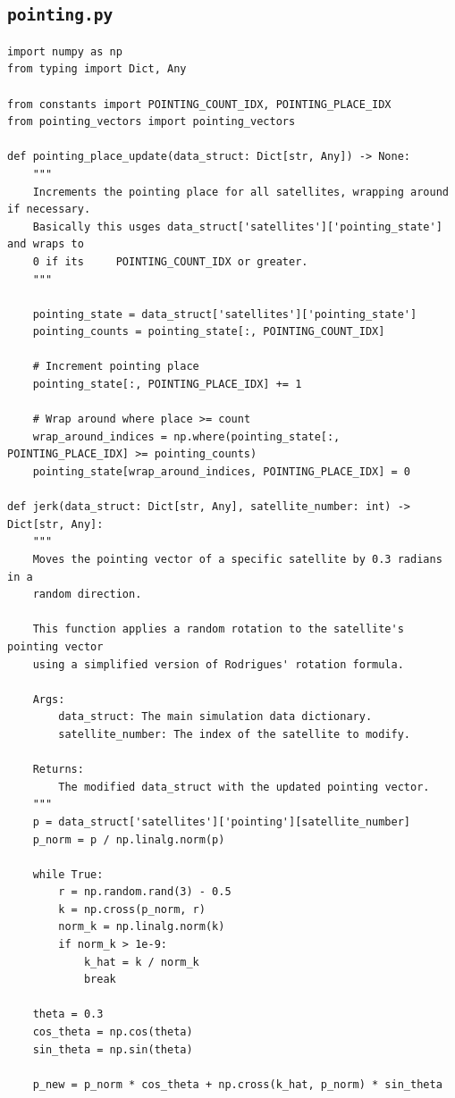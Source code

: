 \documentclass[11pt]{article}
\begin{document}
\subsection{\texttt{pointing.py}}
\begin{Verbatim}
import numpy as np
from typing import Dict, Any

from constants import POINTING_COUNT_IDX, POINTING_PLACE_IDX
from pointing_vectors import pointing_vectors

def pointing_place_update(data_struct: Dict[str, Any]) -> None:
    """
    Increments the pointing place for all satellites, wrapping around if necessary.
    Basically this usges data_struct['satellites']['pointing_state'] and wraps to
    0 if its     POINTING_COUNT_IDX or greater.
    """

    pointing_state = data_struct['satellites']['pointing_state']
    pointing_counts = pointing_state[:, POINTING_COUNT_IDX]

    # Increment pointing place
    pointing_state[:, POINTING_PLACE_IDX] += 1

    # Wrap around where place >= count
    wrap_around_indices = np.where(pointing_state[:, POINTING_PLACE_IDX] >= pointing_counts)
    pointing_state[wrap_around_indices, POINTING_PLACE_IDX] = 0

def jerk(data_struct: Dict[str, Any], satellite_number: int) -> Dict[str, Any]:
    """
    Moves the pointing vector of a specific satellite by 0.3 radians in a
    random direction.

    This function applies a random rotation to the satellite's pointing vector
    using a simplified version of Rodrigues' rotation formula.

    Args:
        data_struct: The main simulation data dictionary.
        satellite_number: The index of the satellite to modify.

    Returns:
        The modified data_struct with the updated pointing vector.
    """
    p = data_struct['satellites']['pointing'][satellite_number]
    p_norm = p / np.linalg.norm(p)

    while True:
        r = np.random.rand(3) - 0.5
        k = np.cross(p_norm, r)
        norm_k = np.linalg.norm(k)
        if norm_k > 1e-9:
            k_hat = k / norm_k
            break

    theta = 0.3
    cos_theta = np.cos(theta)
    sin_theta = np.sin(theta)

    p_new = p_norm * cos_theta + np.cross(k_hat, p_norm) * sin_theta


\end{Verbatim}
\end{document}
